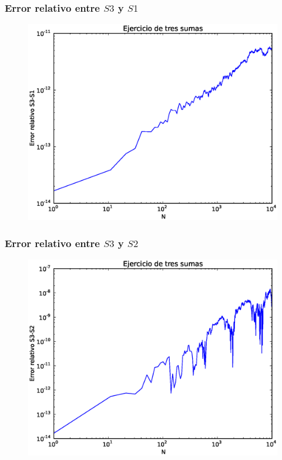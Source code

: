 \begin{frame}
\frametitle{Error relativo entre $S3$ y $S1$}
\begin{figure}
	\centering
	\includegraphics[scale=0.5]{Imagenes/TresSumasS3vsS1.eps} 
\end{figure}
\end{frame}
\begin{frame}
\frametitle{Error relativo entre $S3$ y $S2$}
\begin{figure}
	\centering
	\includegraphics[scale=0.5]{Imagenes/TresSumasS3vsS2.eps} 
\end{figure}
\end{frame}
